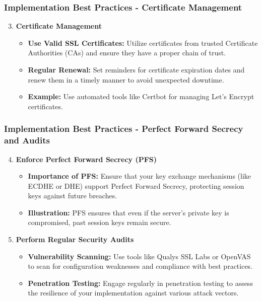 \documentclass{beamer}
\begin{document}
\begin{frame}[fragile]
    \frametitle{Implementation Best Practices - Certificate Management}
    \begin{enumerate}
        \setcounter{enumi}{2} %
        \item \textbf{Certificate Management}
        \begin{itemize}
            \item \textbf{Use Valid SSL Certificates:} Utilize certificates from trusted Certificate Authorities (CAs) and ensure they have a proper chain of trust.
            \item \textbf{Regular Renewal:} Set reminders for certificate expiration dates and renew them in a timely manner to avoid unexpected downtime.
            \item \textbf{Example:} Use automated tools like Certbot for managing Let’s Encrypt certificates.
        \end{itemize}
    \end{enumerate}
\end{frame}

\begin{frame}[fragile]
    \frametitle{Implementation Best Practices - Perfect Forward Secrecy and Audits}
    \begin{enumerate}
        \setcounter{enumi}{3} %
        \item \textbf{Enforce Perfect Forward Secrecy (PFS)}
        \begin{itemize}
            \item \textbf{Importance of PFS:} Ensure that your key exchange mechanisms (like ECDHE or DHE) support Perfect Forward Secrecy, protecting session keys against future breaches.
            \item \textbf{Illustration:} PFS ensures that even if the server's private key is compromised, past session keys remain secure.
        \end{itemize}
        
        \item \textbf{Perform Regular Security Audits}
        \begin{itemize}
            \item \textbf{Vulnerability Scanning:} Use tools like Qualys SSL Labs or OpenVAS to scan for configuration weaknesses and compliance with best practices.
            \item \textbf{Penetration Testing:} Engage regularly in penetration testing to assess the resilience of your implementation against various attack vectors.
        \end{itemize}
    \end{enumerate}
\end{frame}
\end{document}
